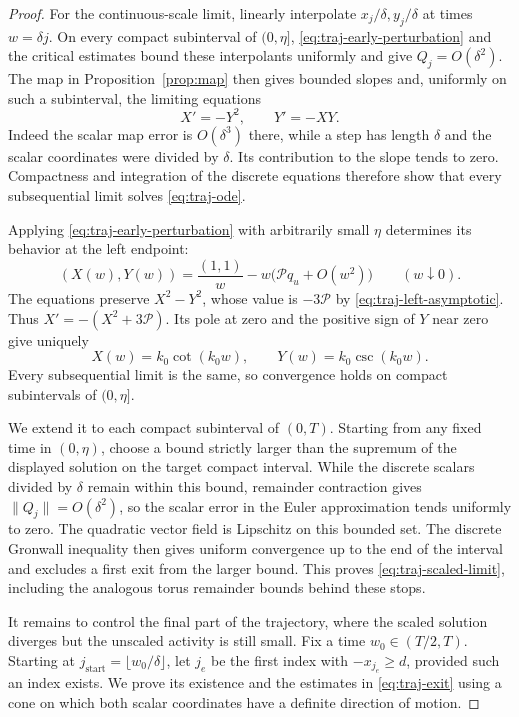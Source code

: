 \begin{proof}
For the continuous-scale limit, linearly interpolate
\(x_j/\delta,y_j/\delta\) at times \(w=\delta j\).
On every compact subinterval of \((0,\eta]\),
\eqref{eq:traj-early-perturbation} and the critical estimates bound
these interpolants uniformly and give \(Q_j=O(\delta^2)\).
The map in Proposition~\ref{prop:map} then gives bounded slopes and,
uniformly on such a subinterval, the limiting equations
\begin{equation}\label{eq:traj-ode}
                        X'=-Y^2,\qquad Y'=-XY.
\end{equation}
Indeed the scalar map error is \(O(\delta^3)\) there, while a
step has length \(\delta\) and the scalar coordinates were divided
by \(\delta\).  Its contribution to the slope tends to zero.
Compactness and integration of the discrete equations therefore
show that every subsequential limit solves
\eqref{eq:traj-ode}.

Applying \eqref{eq:traj-early-perturbation} with arbitrarily small
\(\eta\) determines its behavior at the left endpoint:
\begin{equation}\label{eq:traj-left-asymptotic}
 (X(w),Y(w))
   =\frac{(1,1)}w
       -w\bigl(\mathcal Pq_u+O(w^2)\bigr)
                  \qquad(w\downarrow0).
\end{equation}
The equations preserve \(X^2-Y^2\), whose value is
\(-3\mathcal P\) by \eqref{eq:traj-left-asymptotic}.
Thus \(X'=-(X^2+3\mathcal P)\).  Its pole at zero and the
positive sign of \(Y\) near zero give uniquely
\[
 X(w)=k_0\cot(k_0w),\qquad Y(w)=k_0\csc(k_0w).
\]
Every subsequential limit is the same, so convergence holds on
compact subintervals of \((0,\eta]\).

We extend it to each compact subinterval of \((0,T)\).
Starting from any fixed time in \((0,\eta)\), choose a bound
strictly larger than the supremum of the displayed solution on
the target compact interval.  While the discrete scalars divided
by \(\delta\) remain within this bound, remainder contraction
gives \(\|Q_j\|=O(\delta^2)\), so the scalar error in the Euler
approximation tends uniformly to zero.  The quadratic vector field
is Lipschitz on this bounded set.  The discrete Gronwall inequality
then gives uniform convergence up to the end of the interval and
excludes a first exit from the larger bound.  This proves
\eqref{eq:traj-scaled-limit}, including the analogous torus
remainder bounds behind these stops.

It remains to control the final part of the trajectory, where the
scaled solution diverges but the unscaled activity is still small.
Fix a time \(w_0\in(T/2,T)\).  Starting at
\(j_{\mathrm{start}}=\lfloor w_0/\delta\rfloor\), let \(j_e\) be the first
index with \(-x_{j_e}\ge d\), provided such an index exists.
We prove its existence and the estimates in
\eqref{eq:traj-exit} using a cone on which both scalar coordinates
have a definite direction of motion.


\end{proof}
